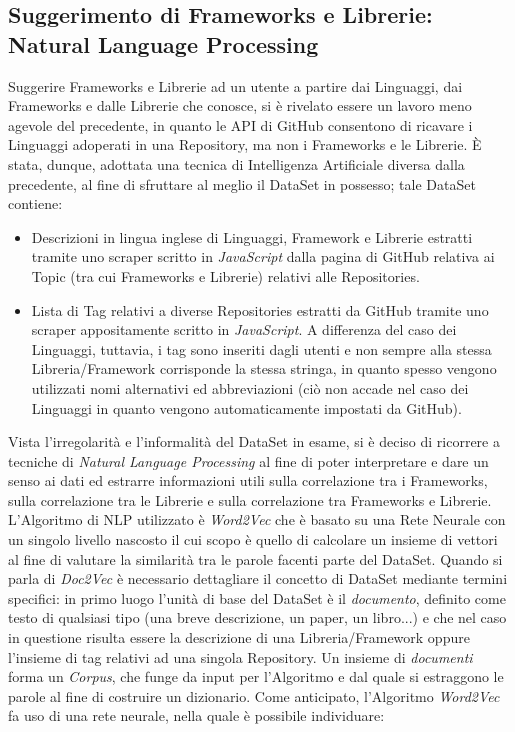 \subsection{Suggerimento di Frameworks e Librerie: Natural Language Processing}
Suggerire Frameworks e Librerie ad un utente a partire dai Linguaggi, dai Frameworks e dalle Librerie che conosce, si è rivelato essere un lavoro meno agevole del precedente, in quanto le API di GitHub consentono di ricavare i Linguaggi adoperati in una Repository, ma non i Frameworks e le Librerie. È stata, dunque, adottata una tecnica di Intelligenza Artificiale diversa dalla precedente, al fine di sfruttare al meglio il DataSet in possesso; tale DataSet contiene:
\begin{itemize}
    \item Descrizioni in lingua inglese di Linguaggi, Framework e Librerie estratti tramite uno scraper scritto in \emph{JavaScript} dalla pagina di GitHub relativa ai Topic (tra cui Frameworks e Librerie) relativi alle Repositories. 
    \item Lista di Tag relativi a diverse Repositories estratti da GitHub tramite uno scraper appositamente scritto in \emph{JavaScript}. A differenza del caso dei Linguaggi, tuttavia, i tag sono inseriti dagli utenti e non sempre alla stessa Libreria/Framework corrisponde la stessa stringa, in quanto spesso vengono utilizzati nomi alternativi ed abbreviazioni (ciò non accade nel caso dei Linguaggi in quanto vengono automaticamente impostati da GitHub). 
\end{itemize}
Vista l'irregolarità e l'informalità del DataSet in esame, si è deciso di ricorrere a tecniche di \emph{Natural Language Processing} al fine di poter interpretare e dare un senso ai dati ed estrarre informazioni utili sulla correlazione tra i Frameworks, sulla correlazione tra le Librerie e sulla correlazione tra Frameworks e Librerie. L'Algoritmo di NLP utilizzato è \emph{Word2Vec} \cite{Word2Vec} che è basato su una Rete Neurale con un singolo livello nascosto il cui scopo è quello di calcolare un insieme di vettori al fine di valutare la similarità tra le parole facenti parte del DataSet. Quando si parla di \emph{Doc2Vec} è necessario dettagliare il concetto di DataSet mediante termini specifici: in primo luogo l'unità di base del DataSet è il \emph{documento}, definito come testo di qualsiasi tipo (una breve descrizione, un paper, un libro...) e che nel caso in questione risulta essere la descrizione di una Libreria/Framework oppure l'insieme di tag relativi ad una singola Repository. Un insieme di \emph{documenti} forma un \emph{Corpus}, che funge da input per l'Algoritmo e dal quale si estraggono le parole al fine di costruire un dizionario. Come anticipato, l'Algoritmo \emph{Word2Vec} fa uso di una rete neurale, nella quale è possibile individuare:
